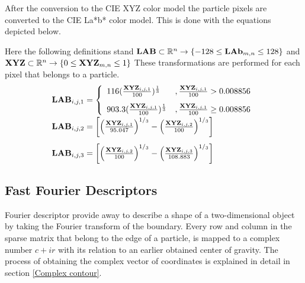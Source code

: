 \documentclass[11pt,fleqn,,a4paper,twoside,openright]{book}
\begin{document}
After the conversion to the CIE XYZ color model the particle pixels are converted to the CIE La*b* color model. This is done with the equations depicted below.
\begin{sBox}
	Here the following definitions stand $\mat{LAB} \subset \mathbb{R}^n \rightarrow \{-128 \leq \mat{LAb}_{m,n} \leq 128\} $ and $\mat{XYZ} \subset \mathbb{R}^n \rightarrow \{0 \leq \mat{XYZ}_{m,n} \leq 1\} $ These transformations are performed for each pixel that belongs to a particle.
	\begin{equation}
	\begin{array}{ll}
		\mat{LAB}_{i,j,1} = \left\{
		\begin{array}{ll}
		116(\frac{\mat{XYZ}_{i,j,1}}{100})^{\frac{1}{3}} & ,\frac{\mat{XYZ}_{i,j,1}}{100} > 0.008856 \\[0.3cm]
		903.3(\frac{\mat{XYZ}_{i,j,1}}{100})^{\frac{1}{3}} & ,\frac{\mat{XYZ}_{i,j,1}}{100} \geq 0.008856
		\end{array}
		\right. \\[0.5cm]
	    \mat{LAB}_{i,j,2} = \left[\left(\frac{\mat{XYZ}_{i,j,1}}{95.047}\right)^{1/_3} - \left(\frac{\mat{XYZ}_{i,j,2}}{100}\right)^{1/_3}\right] \\[0.5cm]
 	    \mat{LAB}_{i,j,3} = \left[\left(\frac{\mat{XYZ}_{i,j,2}}{100}\right)^{1/_3} - \left(\frac{\mat{XYZ}_{i,j,3}}{108.883}\right)^{1/_3}\right]
	\end{array}
	\end{equation}
\end{sBox}

\subsection{Fast Fourier Descriptors}\label{FFT}
Fourier descriptor provide away to describe a shape of a two-dimensional object by taking the Fourier transform of the boundary. Every row and column in the sparse matrix that belong to the edge of a particle, is mapped to a complex number $ c + i r $ with its relation to an earlier obtained center of gravity. The process of obtaining the complex vector of coordinates is explained in detail in section \ref{Complex contour}.
\end{document}
